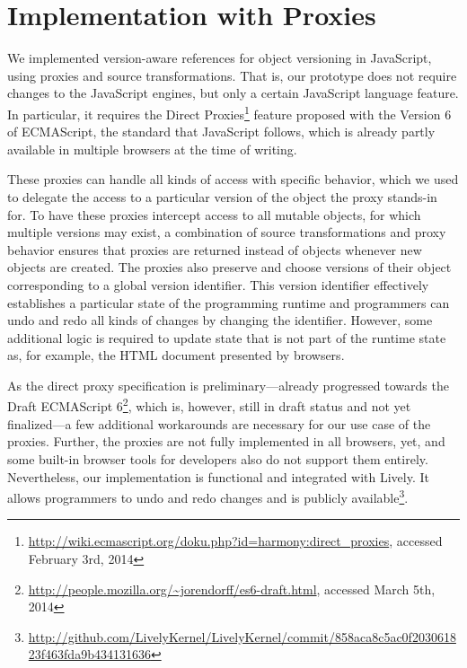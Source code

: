 \chapter{Implementation with Proxies} \label{chapter:IMPLEMENTATION}



We implemented version-aware references for object versioning in JavaScript, using proxies and source transformations.
That is, our prototype does not require changes to the JavaScript engines, but only a certain JavaScript language feature.
In particular, it requires the Direct Proxies\footnote{\url{http://wiki.ecmascript.org/doku.php?id=harmony:direct_proxies}, accessed February 3rd, 2014} feature proposed with the Version 6 of ECMAScript, the standard that JavaScript follows, which is already partly available in multiple browsers at the time of writing.

These proxies can handle all kinds of access with specific behavior, which we used to delegate the access to a particular version of the object the proxy stands-in for.
To have these proxies intercept access to all mutable objects, for which multiple versions may exist, a combination of source transformations and proxy behavior ensures that proxies are returned instead of objects whenever new objects are created.
The proxies also preserve and choose versions of their object corresponding to a global version identifier.
This version identifier effectively establishes a particular state of the programming runtime and programmers can undo and redo all kinds of changes by changing the identifier.
However, some additional logic is required to update state that is not part of the runtime state as, for example, the HTML document presented by browsers.

As the direct proxy specification is preliminary---already progressed towards the Draft ECMAScript 6\footnote{\url{http://people.mozilla.org/~jorendorff/es6-draft.html}, accessed March 5th, 2014}, which is, however, still in draft status and not yet finalized---a few additional workarounds are necessary for our use case of the proxies.
Further, the proxies are not fully implemented in all browsers, yet, and some built-in browser tools for developers also do not support them entirely.
Nevertheless, our implementation is functional and integrated with Lively.
It allows programmers to undo and redo changes and is publicly available\footnote{\url{http://github.com/LivelyKernel/LivelyKernel/commit/858aca8c5ac0f203061823f463fda9b434131636}}.



